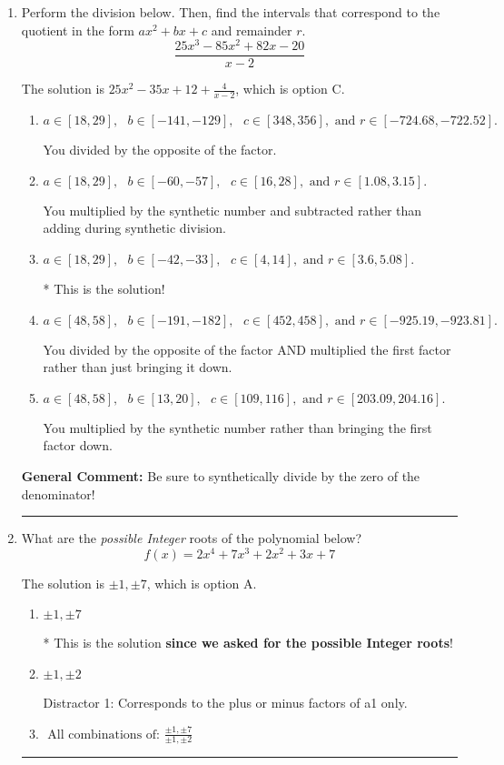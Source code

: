 \documentclass{extbook}[14pt]
\newcommand{\litem}[1]{\item #1

\rule{\textwidth}{0.4pt}}
\begin{document}
\begin{enumerate}\litem{
Perform the division below. Then, find the intervals that correspond to the quotient in the form $ax^2+bx+c$ and remainder $r$.
\[ \frac{25x^{3} -85 x^{2} +82 x -20}{x -2} \]

The solution is \( 25x^{2} -35 x + 12 + \frac{4}{x -2} \), which is option C.\begin{enumerate}[label=\Alph*.]
\item \( a \in [18, 29], \text{   } b \in [-141, -129], \text{   } c \in [348, 356], \text{   and   } r \in [-724.68, -722.52]. \)

 You divided by the opposite of the factor.
\item \( a \in [18, 29], \text{   } b \in [-60, -57], \text{   } c \in [16, 28], \text{   and   } r \in [1.08, 3.15]. \)

 You multiplied by the synthetic number and subtracted rather than adding during synthetic division.
\item \( a \in [18, 29], \text{   } b \in [-42, -33], \text{   } c \in [4, 14], \text{   and   } r \in [3.6, 5.08]. \)

* This is the solution!
\item \( a \in [48, 58], \text{   } b \in [-191, -182], \text{   } c \in [452, 458], \text{   and   } r \in [-925.19, -923.81]. \)

 You divided by the opposite of the factor AND multiplied the first factor rather than just bringing it down.
\item \( a \in [48, 58], \text{   } b \in [13, 20], \text{   } c \in [109, 116], \text{   and   } r \in [203.09, 204.16]. \)

 You multiplied by the synthetic number rather than bringing the first factor down.
\end{enumerate}

\textbf{General Comment:} Be sure to synthetically divide by the zero of the denominator!
}
\litem{
What are the \textit{possible Integer} roots of the polynomial below?
\[ f(x) = 2x^{4} +7 x^{3} +2 x^{2} +3 x + 7 \]

The solution is \( \pm 1,\pm 7 \), which is option A.\begin{enumerate}[label=\Alph*.]
\item \( \pm 1,\pm 7 \)

* This is the solution \textbf{since we asked for the possible Integer roots}!
\item \( \pm 1,\pm 2 \)

 Distractor 1: Corresponds to the plus or minus factors of a1 only.
\item \( \text{ All combinations of: }\frac{\pm 1,\pm 7}{\pm 1,\pm 2} \)


\end{enumerate}}
\end{enumerate}
\end{document}
